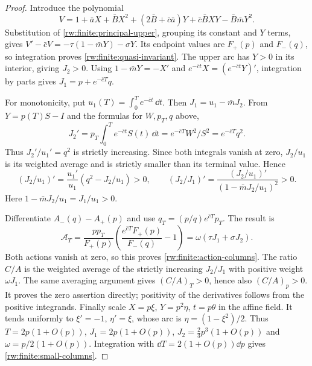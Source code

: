 \begin{proof}
Introduce the polynomial
\[
 V=1+\bar aX+\bar BX^2+(2\bar B+\bar c\bar a)Y
                  +\bar c\bar BXY-\bar B\bar mY^2.
\]
Substitution of \eqref{rw:finite:principal-upper}, grouping its
constant and $Y$ terms, gives
$V'-\bar cV=-\tau(1-\bar mY)-\sigma Y$.
Its endpoint values are $F_+(p)$ and $F_-(q)$, so integration
proves \eqref{rw:finite:quasi-invariant}.
The upper arc has $Y>0$ in its interior, giving $J_2>0$.
Using $1-\bar mY=-X'$ and
$e^{-\bar ct}X=(e^{-\bar ct}Y)'$, integration by parts gives
$J_1=p+e^{-\bar cT}q$.

For monotonicity, put $u_1(T)=\int_0^T e^{-\bar ct}\,\dd t$.
Then $J_1=u_1-\bar mJ_2$.
From $Y=p(T)S-I$ and the formulas for $W,p_T,q$ above,
\[
 J_2'=p_T\int_0^T e^{-\bar ct}S(t)\,\dd t
       =e^{-\bar cT}W^2/S^2=e^{-\bar cT}q^2.
\]
Thus $J_2'/u_1'=q^2$ is strictly increasing. Since both integrals
vanish at zero, $J_2/u_1$ is its weighted average and is strictly
smaller than its terminal value. Hence
\[
 (J_2/u_1)'=\frac{u_1'}{u_1}(q^2-J_2/u_1)>0,
 \qquad
 (J_2/J_1)'=
 \frac{(J_2/u_1)'}{(1-\bar mJ_2/u_1)^2}>0.
\]
Here $1-\bar mJ_2/u_1=J_1/u_1>0$.

Differentiate $A_-(q)-A_+(p)$ and use
$q_T=(p/q)e^{\bar cT}p_T$. The result is
\[
 \mathcal A_T=
 \frac{p p_T}{F_+(p)}
       \left(\frac{e^{\bar cT}F_+(p)}{F_-(q)}-1\right)
             =\omega(\tau J_1+\sigma J_2).
\]
Both actions vanish at zero, so this proves
\eqref{rw:finite:action-columns}. The ratio $C/A$ is the weighted
average of the strictly increasing $J_2/J_1$ with positive weight
$\omega J_1$. The same averaging argument gives $(C/A)_T>0$,
hence also $(C/A)_p>0$. It proves the zero assertion directly;
positivity of the derivatives follows from the positive integrands.
Finally scale $X=p\xi$, $Y=p^2\eta$, $t=p\theta$ in the
affine field. It tends uniformly to
$\xi'=-1$, $\eta'=\xi$, whose arc is
$\eta=(1-\xi^2)/2$. Thus
$T=2p(1+O(p))$, $J_1=2p(1+O(p))$,
$J_2=\frac23p^3(1+O(p))$ and $\omega=p/2(1+O(p))$.
Integration with $\dd T=2(1+O(p))\dd p$ gives
\eqref{rw:finite:small-columns}.
\end{proof}


